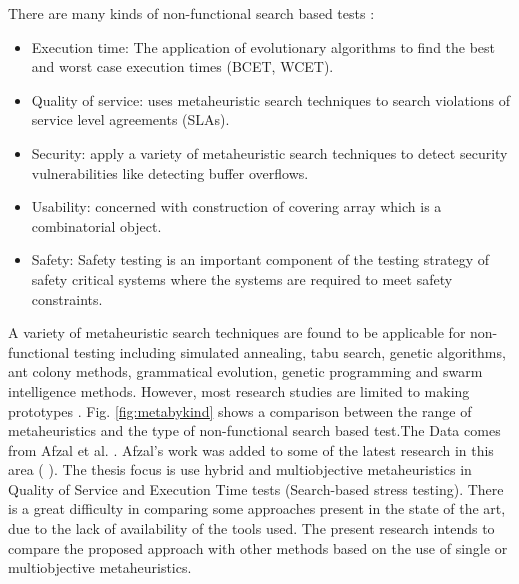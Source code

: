 \documentclass[espaco=umemeio,chapter=TITLE,twoside,openright]{abnt}
\begin{document}
There are many kinds of non-functional search based tests  \cite{Afzal2009a}:

\begin{itemize}
\item Execution time: The application of evolutionary algorithms to find the best and worst case execution times (BCET, WCET).
\item Quality of service: uses metaheuristic search techniques to search violations of service level agreements (SLAs).
\item Security: apply a variety of metaheuristic search techniques  to detect security vulnerabilities like detecting buffer overflows.
\item Usability: concerned with construction of covering array which is a combinatorial object.
\item Safety: Safety testing is an important component of the testing strategy of safety critical systems where the systems are required to meet safety constraints.
\end{itemize}

A variety of metaheuristic search techniques are found to be applicable for non-functional testing including simulated annealing, tabu search, genetic algorithms, ant colony methods, grammatical evolution, genetic programming and swarm intelligence methods. However, most research studies are limited to making prototypes \cite{Afzal2009a}.  Fig. \ref{fig:metabykind} shows a comparison between the range of metaheuristics and the type of non-functional search based test.The Data comes from Afzal et al. \cite{Afzal2009a}. Afzal's work was added to some of the latest research in this area (\cite{Garousi2006} \cite{Garousi2010} \cite{DiAlesio2013} \cite{DiAlesio2014} \cite{Alesio2015} \cite{Gois2016}). The thesis focus is use  hybrid and multiobjective metaheuristics in Quality of Service and Execution Time tests (Search-based stress testing). There is a great difficulty in
comparing some approaches present in the state of
the art, due to the lack of availability of the tools used. The present research intends to compare the proposed approach with other methods based on the use of single or multiobjective metaheuristics. 
\end{document}
